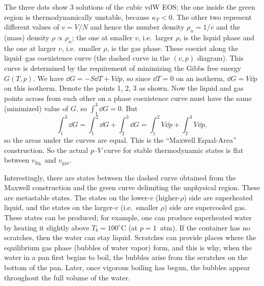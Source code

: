 The three dots show 3 solutions of the cubic vdW EOS; the one inside the green region is thermodynamically
unstable, because $\kappa_T<0$. The other two represent different values of $v = V/N$ and hence the number density
$\rho_n = 1/v$ and the (mass) density $\rho\propto\rho_n$; the one at smaller $v$, i.e.\ larger $\rho$, is the
liquid phase and the one at larger $v$, i.e.\ smaller $\rho$, is the gas phase. These coexist along the liquid--gas
coexistence curve (the dashed curve in the $(v,p)$ diagram). This curve is determined by the requirement of
minimizing the Gibbs free energy $G(T,p)$. We have $\dd G = -S\dd T + V\dd p$, so since $\dd T = 0$ on an
isotherm, $\dd G = V\dd p$ on this isotherm. Denote the points 1, 2, 3 as shown. Now the liquid and gas points
across from each other on a phase coexistence curve must have the same (minimized) value of $G$, so
$\int_1^3\dd G = 0$. But
\begin{equation}
  \int_1^3\dd G = \int_1^2\dd G + \int_2^3\dd G = \int_1^2V\dd p + \int_2^3V\dd p,
\end{equation}
so the areas under the curves are equal. This is the ``Maxwell Equal-Area'' construction. So the actual $p$--$V$
curve for stable thermodynamic states is flat between $v_{\text{liq.}}$ and $v_{\text{gas}}$.

\begin{diagram}
\end{diagram}

Interestingly, there are states between the dashed curve obtained from the Maxwell construction and the green curve
delimiting the unphysical region. These are metastable states. The states on the lower-$v$ (higher-$\rho$) side are
superheated liquid, and the states on the larger-$v$ (i.e.\ smaller $\rho$) side are supercooled gas. These states can
be produced; for example, one can produce superheated water by heating it slightly above $T_b = 100^\circ$C (at
$p = 1$~atm). If the container has no scratches, then the water can stay liquid. Scratches can provide places where
the equilibrium gas phase (bubbles of water vapor) form, and this is why, when the water in a pan first begins to
boil, the bubbles arise from the scratches on the bottom of the pan. Later, once vigorous boiling has begun, the
bubbles appear throughout the full volume of the water.

